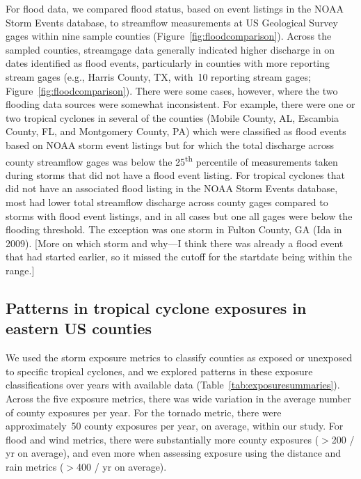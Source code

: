 For flood data, we compared flood status, based on event listings in the NOAA
Storm Events database, to streamflow measurements at \ac{US} Geological Survey
gages within nine sample counties (Figure~\ref{fig:floodcomparison}).  Across
the sampled counties, streamgage data generally indicated higher discharge in
on dates identified as flood events, particularly in counties with more
reporting stream gages (e.g., Harris County, TX, with~10 reporting stream
gages; Figure~\ref{fig:floodcomparison}). There were some cases, however, where
the two flooding data sources were somewhat inconsistent.  For example, there
were one or two tropical cyclones in several of the counties (Mobile County,
AL, Escambia County, FL, and Montgomery County, PA) which were classified as
flood events based on NOAA storm event listings but for which the total
discharge across county streamflow gages was below the 25\textsuperscript{th}
percentile of measurements taken during storms that did not have a flood event
listing. For tropical cyclones that did not have an associated flood listing in
the NOAA Storm Events database, most had lower total streamflow discharge
across county gages compared to storms with flood event listings, and in all
cases but one all gages were below the flooding threshold.  The exception was
one storm in Fulton County, GA (Ida in 2009). [More on which storm and why---I
think there was already a flood event that had started earlier, so it missed
the cutoff for the startdate being within the range.]

\subsection*{Patterns in tropical cyclone exposures in eastern \ac{US} counties}

We used the storm exposure metrics to classify counties as exposed or unexposed
to specific tropical cyclones, and we explored patterns in these exposure
classifications over years with available data
(Table~\ref{tab:exposuresummaries}). Across the five exposure metrics, there
was wide variation in the average number of county exposures per year. For the
tornado metric, there were approximately~50 county exposures per
year, on average, within our study.  For flood and wind metrics, there were
substantially more county exposures ($>$200 / yr on average), and
even more when assessing exposure using the distance and rain metrics ($>$400 /
yr on average). 

